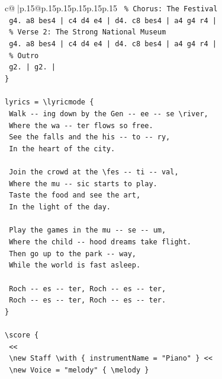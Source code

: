 \documentclass{article}
\begin{document}
{\begin{supertabular}{c@{$\;$}|p{.15\linewidth}@{}p{.15\linewidth}p{.15\linewidth}p{.15\linewidth}p{.15\linewidth}p{.15\linewidth}}
{{{\texttt{  \% Chorus: The Festival} \\
\texttt{  g4. a8 bes4 | c4 d4 e4 | d4. c8 bes4 | a4 g4 r4 |} \\
\texttt{  \% Verse 2: The Strong National Museum} \\
\texttt{  g4. a8 bes4 | c4 d4 e4 | d4. c8 bes4 | a4 g4 r4 |} \\
\texttt{  \% Outro} \\
\texttt{  g2. | g2. |} \\
\texttt{\}} \\
\\ 
\texttt{lyrics = \textbackslash{}lyricmode \{} \\
\texttt{  Walk {-}{-} ing down by the Gen {-}{-} ee {-}{-} se \textbackslash{}river,} \\
\texttt{  Where the wa {-}{-} ter flows so free.} \\
\texttt{  See the falls and the his {-}{-} to {-}{-} ry,} \\
\texttt{  In the heart of the city.} \\
\\ 
\texttt{  Join the crowd at the \textbackslash{}fes {-}{-} ti {-}{-} val,} \\
\texttt{  Where the mu {-}{-} sic starts to play.} \\
\texttt{  Taste the food and see the art,} \\
\texttt{  In the light of the day.} \\
\\ 
\texttt{  Play the games in the mu {-}{-} se {-}{-} um,} \\
\texttt{  Where the child {-}{-} hood dreams take flight.} \\
\texttt{  Then go up to the park {-}{-} way,} \\
\texttt{  While the world is fast asleep.} \\
\\ 
\texttt{  Roch {-}{-} es {-}{-} ter, Roch {-}{-} es {-}{-} ter,} \\
\texttt{  Roch {-}{-} es {-}{-} ter, Roch {-}{-} es {-}{-} ter.} \\
\texttt{\}} \\
\\ 
\texttt{\textbackslash{}score \{} \\
\texttt{  <<} \\
\texttt{    \textbackslash{}new Staff \textbackslash{}with \{ instrumentName = "Piano" \} <<} \\
\texttt{      \textbackslash{}new Voice = "melody" \{ \textbackslash{}melody \}} \\
}}}
\end{supertabular}}
\end{document}
